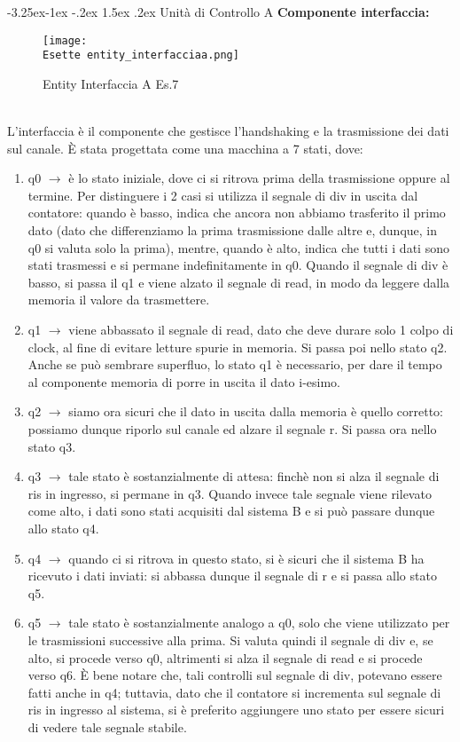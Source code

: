 \documentclass[12pt]{article}
\makeatletter
\renewcommand\subsubsection{\@startsection{subsubsection}{3}{\z@}%
            {-3.25ex\@plus -1ex \@minus -.2ex}%
            {1.5ex \@plus .2ex}%
            {\normalfont\large\bfseries}}
\def \Esette {Allegati/Esercizio7/}
\makeatother
\begin{document}
\subsubsection{Unità di Controllo A}
{\large \textbf{Componente interfaccia:}}
\begin{figure}[ht!]
    \centering
    \texttt{[image: \\Esette entity\_interfacciaa.png]}
    \caption{Entity Interfaccia A Es.7}
\end{figure}
\\L’interfaccia è il componente che gestisce l’handshaking e la trasmissione dei dati sul canale. È stata progettata come una macchina a 7 stati, dove:
\begin{enumerate}
    \item q0 $\rightarrow$ è lo stato iniziale, dove ci si ritrova prima della trasmissione oppure al termine. Per distinguere i 2 casi si utilizza il segnale di div in uscita dal contatore: quando è basso, indica che ancora non abbiamo trasferito il primo dato (dato che differenziamo la prima trasmissione dalle altre e, dunque, in q0 si valuta solo la prima), mentre, quando è alto, indica che tutti i dati sono stati trasmessi e si permane indefinitamente in q0.
          Quando il segnale di div è basso, si passa il q1 e viene alzato il segnale di read, in modo da leggere dalla memoria il valore da trasmettere.
    \item q1 $\rightarrow$ viene abbassato il segnale di read, dato che deve durare solo 1 colpo di clock, al fine di evitare letture spurie in memoria. Si passa poi nello stato q2.
          Anche se può sembrare superfluo, lo stato q1 è necessario, per dare il tempo al componente memoria di porre in uscita il dato i-esimo.
    \item q2 $\rightarrow$ siamo ora sicuri che il dato in uscita dalla memoria è quello corretto: possiamo dunque riporlo sul canale ed alzare il segnale r. Si passa ora nello stato q3.
    \item q3 $\rightarrow$ tale stato è sostanzialmente di attesa: finchè non si alza il segnale di ris in ingresso, si permane in q3. Quando invece tale segnale viene rilevato come alto, i dati sono stati acquisiti dal sistema B e si può passare dunque allo stato q4.
    \item q4 $\rightarrow$ quando ci si ritrova in questo stato, si è sicuri che il sistema B ha ricevuto i dati inviati: si abbassa dunque il segnale di r e si passa allo stato q5.
    \item q5 $\rightarrow$ tale stato è sostanzialmente analogo a q0, solo che viene utilizzato per le trasmissioni successive alla prima. Si valuta quindi il segnale di div e, se alto, si procede verso q0, altrimenti si alza il segnale di read e si procede verso q6. È bene notare che, tali controlli sul segnale di div, potevano essere fatti anche in q4; tuttavia, dato che il contatore si incrementa sul segnale di ris in ingresso al sistema, si è preferito aggiungere uno stato per essere sicuri di vedere tale segnale stabile.

\end{enumerate}
\end{document}
